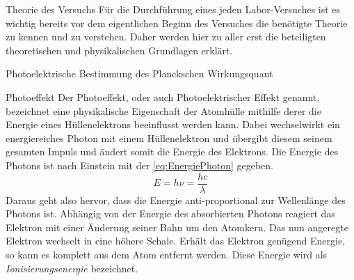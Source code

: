 \documentclass[pdftex, a4paper,11pt, twoside, ngerman]{report}
\begin{document}
  \begin{chapter}{Theorie des Versuchs}
    \label{chp:Theorie}
    Für die Durchführung eines jeden Labor-Versuches ist es wichtig bereits vor
    dem eigentlichen Beginn des Versuches die benötigte Theorie zu kennen und
    zu verstehen. Daher werden hier zu aller erst die beteiligten
    theoretischen und physikalischen Grundlagen erklärt.
   
   
   
    \begin{section}{Photoelektrische Bestimmung des Planckschen Wirkungsquant}
      \label{chp:TheoriePhotoelektrischesWirkungsquantum}
     
     
     
      
      \begin{subsection}{Photoeffekt}
        \label{chp:TheoriePhotoelektrischesWirkungsquantumPhotoeffekt}
        Der Photoeffekt, oder auch Photoelektrischer Effekt genannt, bezeichnet
        eine physikalische Eigenschaft der Atomhülle mithilfe derer die
        Energie eines Hüllenelektrons beeinflusst werden kann. Dabei
        wechselwirkt ein energiereiches Photon mit einem Hüllenelektron und
        übergibt diesem seinem gesamten Impuls und ändert somit die Energie
        des Elektrons. Die Energie des Photons ist nach Einstein mit der
        \cref{eq:EnergiePhoton} gegeben.
        \begin{equation}
          \label{eq:EnergiePhoton}
          E=h\nu=\frac{hc}{\lambda}
        \end{equation}
        Daraus geht also hervor, dass die Energie anti-proportional zur
        Wellenlänge des Photons ist. Abhängig von der Energie des absorbierten
        Photons reagiert das Elektron mit einer Änderung seiner Bahn um den
        Atomkern. Das nun angeregte Elektron wechselt in eine höhere Schale.
        Erhält das Elektron genügend Energie, so kann es komplett aus dem Atom
        entfernt werden. Diese Energie wird als \textit{Ionisierungsenergie}
        bezeichnet.
       

\end{subsection}
\end{section}
\end{chapter}
\end{document}
